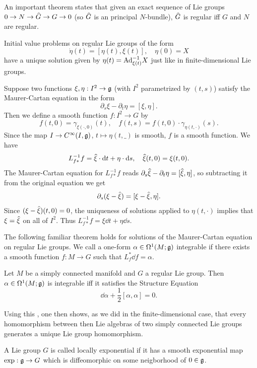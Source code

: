 An important theorem states that given an exact sequence of Lie groups $0\to N\to \wh{G}\to G\to 0$ (so $\wh{G}$ is an principal $N$-bundle), $\wh{G}$ is regular iff $G$ and $N$ are regular.

Initial value problems on regular Lie groups of the form
\[\dot\eta(t)=[\eta(t),\xi(t)],\quad \eta(0)=X\]
have a unique solution given by $\eta(t)=\mathrm{Ad}_{\xi(t)}^{-1
}X$ just like in finite-dimensional Lie groups.


\begin{rem}
    Suppose two functions $\xi,\eta:I^2\to \mathfrak{g}$ (with $I^2$ parametrized by $(t,s)$) satisfy the Maurer-Cartan equation in the form
    \[\partial_s \xi-\partial_t \eta=[\xi,\eta].\]
    Then we define a smooth function $f:I^2\to G$ by
    \[f(t,0)=\gamma_{\xi(\cdot,0)}(t),\quad f(t,s)=f(t,0)\cdot \gamma_{\eta(t,\cdot)}(s).\]
    Since the map $I\to C^\infty(I,\mathfrak{g})$, $t\mapsto \eta(t,\_)$ is smooth, $f$ is a smooth function. We have
    \[L_{f\ast}^{-1}f=\wh{\xi}\cdot \dd t+\eta\cdot \dd s,\quad \wh{\xi}(t,0)=\xi(t,0).\]
    The Maurer-Cartan equation for $L_{f\ast}^{-1}f$ reads $\partial_s \wh{\xi}-\partial_t\eta=[\wh{\xi},\eta]$, so subtracting it from the original equation we get
    \[\partial_s(\xi-\wh{\xi})=[\xi-\wh{\xi},\eta].\]
    Since $(\xi-\wh{\xi})(t,0)=0$, the uniqueness of solutions applied to $\eta(t,\cdot)$ implies that $\xi=\wh{\xi}$ on all of $I^2$. Thus $L_{f\ast}^{-1}f=\xi\dd t+\eta\dd s$.
\end{rem}

The following familiar theorem holds for solutions of the Maurer-Cartan equation on regular Lie groups. We call a one-form $\alpha\in\Omega^1(M;\mathfrak{g})$ integrable if there exists a smooth function $f:M\to G$ such that $L_f^\ast \dd f=\alpha$.

\begin{thm}
    Let $M$ be a simply connected manifold and $G$ a regular Lie group. Then $\alpha\in\Omega^1(M;\mathfrak{g})$ is integrable iff it satisfies the Structure Equation
    \[\dd\alpha +\frac12[\alpha,\alpha]=0.\]
\end{thm}

Using this , one then shows, as we did in the finite-dimensional case, that every homomorphism between then Lie algebras of two simply connected Lie groups generates a unique Lie group homomorphism.

\begin{defn}
    A Lie group $G$ is called locally exponential if it has a smooth exponential map $\exp:\mathfrak{g}\to G$ which is diffeomorphic on some neigborhood of $0\in\mathfrak{g}$.
\end{defn}


